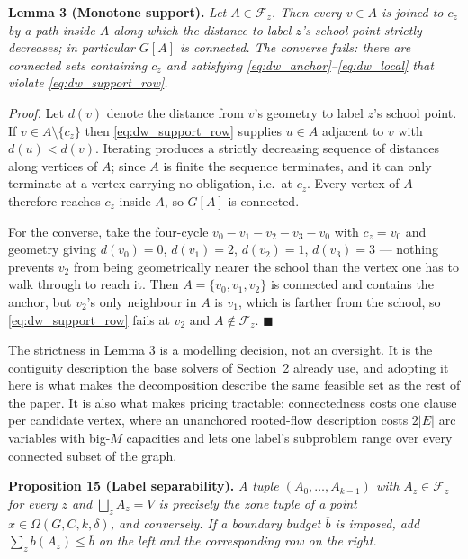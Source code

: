 \documentclass{article}
\begin{document}
\noindent\textbf{Lemma 3 (Monotone support).} \textit{Let $A \in \mathcal F_z$.
Then every $v \in A$ is joined to $c_z$ by a path inside $A$ along which the
distance to label $z$'s school point strictly decreases; in particular $G[A]$ is
connected. The converse fails: there are connected sets containing $c_z$ and
satisfying \eqref{eq:dw_anchor}--\eqref{eq:dw_local} that violate
\eqref{eq:dw_support_row}.}

\textit{Proof.} Let $d(v)$ denote the distance from $v$'s geometry to label
$z$'s school point. If $v \in A \setminus \{c_z\}$ then
\eqref{eq:dw_support_row} supplies $u \in A$ adjacent to $v$ with $d(u) < d(v)$.
Iterating produces a strictly decreasing sequence of distances along vertices of
$A$; since $A$ is finite the sequence terminates, and it can only terminate at a
vertex carrying no obligation, i.e.\ at $c_z$. Every vertex of $A$ therefore
reaches $c_z$ inside $A$, so $G[A]$ is connected.

For the converse, take the four-cycle $v_0 - v_1 - v_2 - v_3 - v_0$ with
$c_z = v_0$ and geometry giving $d(v_0) = 0$, $d(v_1) = 2$, $d(v_2) = 1$,
$d(v_3) = 3$ --- nothing prevents $v_2$ from being geometrically nearer the
school than the vertex one has to walk through to reach it. Then
$A = \{v_0, v_1, v_2\}$ is connected and contains the anchor, but $v_2$'s only
neighbour in $A$ is $v_1$, which is farther from the school, so
\eqref{eq:dw_support_row} fails at $v_2$ and $A \notin \mathcal F_z$.
$\blacksquare$

The strictness in Lemma 3 is a modelling decision, not an oversight. It is the
contiguity description the base solvers of Section~2 already use, and adopting
it here is what makes the decomposition describe the same feasible set as the
rest of the paper. It is also what makes pricing tractable: connectedness costs
one clause per candidate vertex, where an unanchored rooted-flow description
costs $2|E|$ arc variables with big-$M$ capacities and lets one label's
subproblem range over every connected subset of the graph.

\noindent\textbf{Proposition 15 (Label separability).} \textit{A tuple
$(A_0, \dots, A_{k-1})$ with $A_z \in \mathcal F_z$ for every $z$ and
$\bigsqcup_z A_z = V$ is precisely the zone tuple of a point
$x \in \Omega(G, C, k, \delta)$, and conversely. If a boundary budget
$\overline b$ is imposed, add $\sum_z b(A_z) \le \overline b$ on the left and
the corresponding row on the right.}
\end{document}
